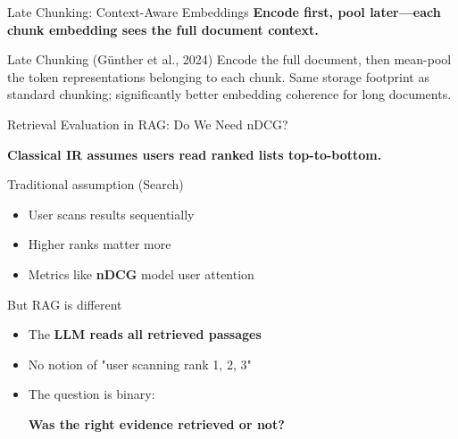 \documentclass[aspectratio=169, xcolor=table]{beamer}
\newif\ifanimated
\newcommand{\cpause}{\ifanimated\pause\fi}
\begin{document}
\begin{frame}[shrink=20]{Late Chunking: Context-Aware Embeddings}
\textbf{Encode first, pool later---each chunk embedding sees the full document context.}

\vspace{0.5em}
\begin{center}
\resizebox{0.88\textwidth}{!}{

}
\end{center}

\cpause
\vspace{0.1em}
\begin{block}{Late Chunking (Günther et al., 2024)}
\footnotesize
Encode the full document, then mean-pool the token representations belonging to each chunk.
Same storage footprint as standard chunking; significantly better embedding coherence for long documents.
\end{block}
\end{frame}

\begin{frame}[shrink=10]{Retrieval Evaluation in RAG: Do We Need nDCG?}
  \cpause
\textbf{Classical IR assumes users read ranked lists top-to-bottom.}

\vspace{0.7em}
\begin{block}{Traditional assumption (Search)}
\begin{itemize}
  \item User scans results sequentially
  \item Higher ranks matter more
  \item Metrics like \textbf{nDCG} model user attention
\end{itemize}
\end{block}

\cpause
\begin{block}{But RAG is different}
\begin{itemize}
  \item The \textbf{LLM reads all retrieved passages}
  \item No notion of "user scanning rank 1, 2, 3"
  \item The question is binary:
  \begin{center}
  \large \textbf{Was the right evidence retrieved or not?}
  \end{center}
\end{itemize}
\end{block}

\vspace{0.5em}
\end{frame}
\end{document}
